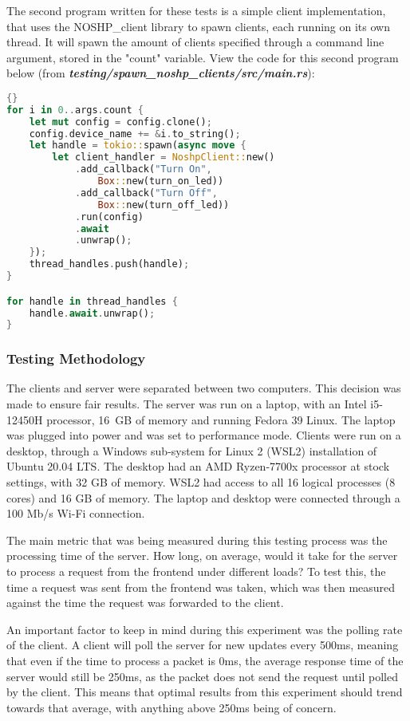 The second program written for these tests is a simple client implementation, that uses the NOSHP\_client library to spawn clients, each running on its own thread. It will spawn the amount of clients specified through a command line argument, stored in the "count" variable. View the code for this second program below (from \textit{\textbf{testing/spawn\_noshp\_clients/src/main.rs}}):
\begin{lstlisting}[language=Rust, style=boxed, showstringspaces=false]{}
for i in 0..args.count {
    let mut config = config.clone();
    config.device_name += &i.to_string();
    let handle = tokio::spawn(async move {
        let client_handler = NoshpClient::new()
            .add_callback("Turn On", 
                Box::new(turn_on_led))
            .add_callback("Turn Off", 
                Box::new(turn_off_led))
            .run(config)
            .await
            .unwrap();
    });
    thread_handles.push(handle);
}

for handle in thread_handles {
    handle.await.unwrap();
}
\end{lstlisting}

\subsubsection{Testing Methodology}
The clients and server were separated between two computers. This decision was made to ensure fair results. The server was run on a laptop, with an Intel i5-12450H processor, 16 GB of memory and running Fedora 39 Linux. The laptop was plugged into power and was set to performance mode. Clients were run on a desktop, through a Windows sub-system for Linux 2 (WSL2) installation of Ubuntu 20.04 LTS. The desktop had an AMD Ryzen-7700x processor at stock settings, with 32 GB of memory. WSL2 had access to all 16 logical processes (8 cores) and 16 GB of memory. The laptop and desktop were connected through a 100 Mb/s Wi-Fi connection. 

The main metric that was being measured during this testing process was the processing time of the server. How long, on average, would it take for the server to process a request from the frontend under different loads? To test this, the time a request was sent from the frontend was taken, which was then measured against the time the request was forwarded to the client.
    
An important factor to keep in mind during this experiment was the polling rate of the client. A client will poll the server for new updates every 500ms, meaning that even if the time to process a packet is 0ms, the average response time of the server would still be 250ms, as the packet does not send the request until polled by the client. This means that optimal results from this experiment should trend towards that average, with anything above 250ms being of concern.

